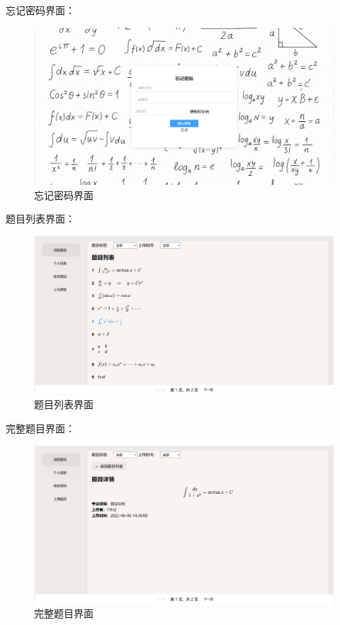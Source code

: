 \documentclass[a4paper,AutoFakeBold={2.7}]{ctexart} %
\begin{document}
忘记密码界面：

\begin{figure}[H]
	\centering
	\includegraphics[width=\linewidth]{./图片/忘记密码界面.png}
	\caption{忘记密码界面}\label{忘记密码界面}
\end{figure}

题目列表界面：

\begin{figure}[H]
	\centering
	\includegraphics[width=\linewidth]{./图片/题目列表界面.png}
	\caption{题目列表界面}\label{题目列表界面}
\end{figure}

完整题目界面：

\begin{figure}[H]
	\centering
	\includegraphics[width=\linewidth]{./图片/完整题目界面.png}
	\caption{完整题目界面}\label{完整题目界面}
\end{figure}
\end{document}
